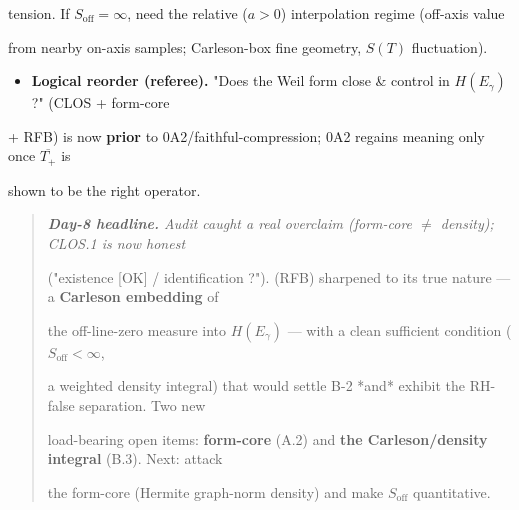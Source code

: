 \documentclass[10pt]{article}
\begin{document}
  tension. If $S_{\mathrm{off}}=\infty$, need the relative ($a>0$) interpolation regime (off-axis value\par
  from nearby on-axis samples; Carleson-box fine geometry, $S(T)$ fluctuation).\par
\begin{itemize}
\item \textbf{Logical reorder (referee).} "Does the Weil form close \& control in $H(E_\gamma)$?" (CLOS + form-core
\end{itemize}
  + RFB) is now \textbf{prior} to 0A2/faithful-compression; 0A2 regains meaning only once $\overline{T_+}$ is\par
  shown to be the right operator.\par

\begin{quote}\itshape
\textbf{Day-8 headline.} Audit caught a real overclaim (form-core $\ne$ density); CLOS.1 is now honest\par
("existence [OK] / identification ?"). (RFB) sharpened to its true nature --- a \textbf{Carleson embedding} of\par
the off-line-zero measure into $H(E_\gamma)$ --- with a clean sufficient condition ($S_{\mathrm{off}}<\infty$,\par
a weighted density integral) that would settle B-2 *and* exhibit the RH-false separation. Two new\par
load-bearing open items: \textbf{form-core} (A.2) and \textbf{the Carleson/density integral} (B.3). Next: attack\par
the form-core (Hermite graph-norm density) and make $S_{\mathrm{off}}$ quantitative.\par
\end{quote}
\end{document}
